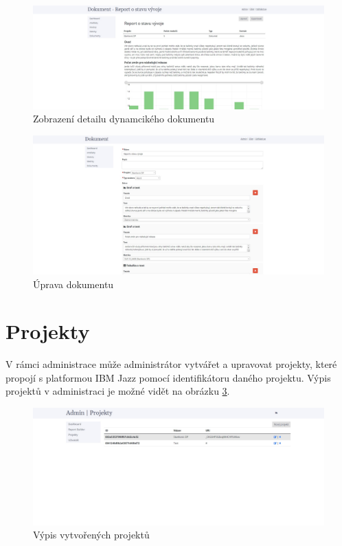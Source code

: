 \documentclass[czech,master]{diploma}
\begin{document}
\begin{figure}[!ht]
    \centering
    \includegraphics[width=1\textwidth]{Diplomka/Figures/metrics_tool/documents_detail.jpg}
    \caption{Zobrazení detailu dynamcikého dokumentu}
    \label{fig:metrics_tool_documents_detail}
\end{figure}


\begin{figure}[!ht]
    \centering
    \includegraphics[width=1\textwidth]{Diplomka/Figures/metrics_tool/documents_edit.jpg}
    \caption{Úprava dokumentu}
    \label{fig:metrics_tool_documents_edit}
\end{figure}
\newpage
\section{Projekty}

V rámci administrace může administrátor vytvářet a upravovat projekty, které propojí s platformou IBM Jazz pomocí identifikátoru daného projektu. Výpis projektů v administraci je možné vidět na obrázku \ref{fig:metrics_tool_admin_projects}.


\begin{figure}[!ht]
    \centering
    \includegraphics[width=1\textwidth]{Diplomka/Figures/metrics_tool/admin_projects.jpg}
    \caption{Výpis vytvořených projektů}
    \label{fig:metrics_tool_admin_projects}
\end{figure}
\newpage
\end{document}
